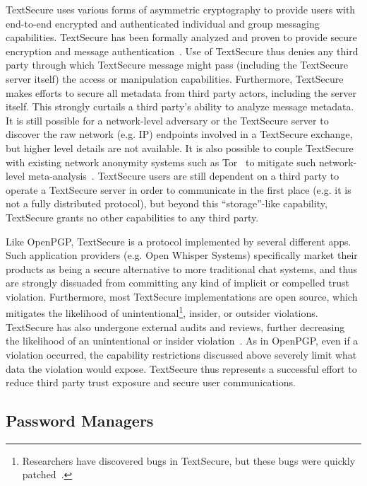TextSecure uses various forms of asymmetric cryptography to provide
users with end-to-end encrypted and authenticated individual and group
messaging capabilities. TextSecure has been formally analyzed and
proven to provide secure encryption and message
authentication~\cite{frosch2014}. Use of TextSecure thus denies any
third party through which TextSecure message might pass (including the
TextSecure server itself) the access or manipulation
capabilities. Furthermore, TextSecure makes efforts to secure all
metadata from third party actors, including the server itself. This
strongly curtails a third party's ability to analyze message
metadata. It is still possible for a network-level adversary or the
TextSecure server to discover the raw network (e.g. IP) endpoints
involved in a TextSecure exchange, but higher level details are not
available. It is also possible to couple TextSecure with existing
network anonymity systems such as Tor~\cite{dingledine2004} to
mitigate such network-level
meta-analysis~\cite{intercept-chatting}. TextSecure users are still
dependent on a third party to operate a TextSecure server in order to
communicate in the first place (e.g. it is not a fully distributed
protocol), but beyond this ``storage''-like capability, TextSecure
grants no other capabilities to any third party.

Like OpenPGP, TextSecure is a protocol implemented by several
different apps. Such application providers (e.g. Open Whisper Systems)
specifically market their products as being a secure alternative to
more traditional chat systems, and thus are strongly dissuaded from
committing any kind of implicit or compelled trust
violation. Furthermore, most TextSecure implementations are open
source, which mitigates the likelihood of
unintentional\footnote{Researchers have discovered bugs in TextSecure,
  but these bugs were quickly patched~\cite{frosch2014}.}, insider, or
outsider violations. TextSecure has also undergone external audits and
reviews, further decreasing the likelihood of an unintentional or
insider violation~\cite{frosch2014}. As in OpenPGP, even if a
violation occurred, the capability restrictions discussed above
severely limit what data the violation would expose. TextSecure thus
represents a successful effort to reduce third party trust exposure
and secure user communications.

\subsection{Password Managers}

